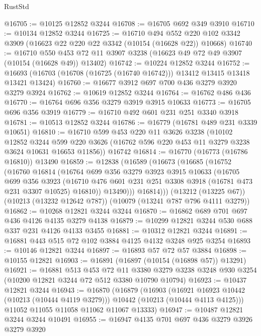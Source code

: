 \begin{lexlean}{RustStd}
\begin{coremodule}
@16705 := @10125 @12852 @3244
@16708 := @16705 @692 @349 @3910
@16710 := @10134 @12852 @3244
@16725 := @16710
    @494
    @552
    @220
    @102
    @3342
    @3909
    (@16623 @22 @220 @22 @3342 (@10154 (@16628 @22)) @10668)
@16740 := @16710
    @550
    @453
    @72
    @11
    @3907
    @3238
    (@16623 @49 @72 @49 @3907 (@10154 (@16628 @49)) @13402)
@16742 := @10224 @12852 @3244
@16752 := @16693 (@16703 (@16708 (@16725 (@16740 @16742))) @13412 @13415 @13418 @13421 @13424)
@16760 := @16677 @3912 @697 @700 @436 @3279 @3920 @3279 @3924
@16762 := @10619 @12852 @3244
@16764 := @16762 @486 @436
@16770 := @16764 @696 @356 @3279 @3919 @3915 @10633
@16773 := @16705 @696 @356 @3919
@16779 := @16710 @492 @601 @231 @251 @3340 @3918
@16781 := @10513 @12852 @3244
@16786 := @16779 (@16781 @489 @231 @3339 @10651)
@16810 := @16710
    @599
    @453
    @220
    @11
    @3626
    @3238
    (@10102
      @12852
      @3244
      @599
      @220
      @3626
      (@16762 @596 @220 @453 @11 @3279 @3238 @3624 @10631 @16653 @11856))
    @16742
@16814 := @16770 (@16773 (@16786 @16810)) @13490
@16859 := @12838
    (@16589
      (@16673
        (@16685
          (@16752
            (@16760
              @16814
              (@16764
                @699
                @356
                @3279
                @3923
                @3915
                @10633
                (@16705
                  @699
                  @356
                  @3923
                  (@16710 @476 @601 @231 @251 @3308 @3918 (@16781 @473 @231 @3307 @10525) @16810))
                @13490)))
          @16814)))
    (@13212 (@13225 @67))
    (@10213 (@13232 @12642 @787))
    (@10079 (@13241 @787 @796 @4111 @3279))
@16862 := @10268 @12821 @3244 @3244
@16870 := @16862 @689 @701 @697 @436 @4126 @4135 @3279 @4138
@16879 := @10299 @12821 @3244 @530 @688 @337 @231 @4126 @4133 @3455
@16881 := @10312 @12821 @3244
@16891 := @16881 @443 @515 @72 @102 @3884 @4125 @4132 @3248 @925 @3254
@16893 := @10146 @12821 @3244
@16897 := @16893 @57 @72 @57 @3884
@16898 := @10155 @12821
@16903 := @16891 (@16897 (@10154 (@16898 @57)) @13291)
@16921 := @16881
    @513
    @453
    @72
    @11
    @3380
    @3279
    @3238
    @3248
    @930
    @3254
    (@10200 @12821 @3244 @72 @512 @3380 @10790 @10794)
@16923 := @10437 @12821 @3244
@16943 := @16870
    (@16879
      (@16903
        (@16921 @16923 @10442 (@10213 (@10444 @4119 @3279)))
        @10442
        (@10213 (@10444 @4113 @4125)))
      @11052
      @11055
      @11058
      @11062
      @11067
      @13333)
@16947 := @10487 @12821 @3244 @3244 @10491
@16955 := @16947 @4135 @701 @697 @436 @3279 @3926 @3279 @3920

\end{coremodule}
\end{lexlean}
